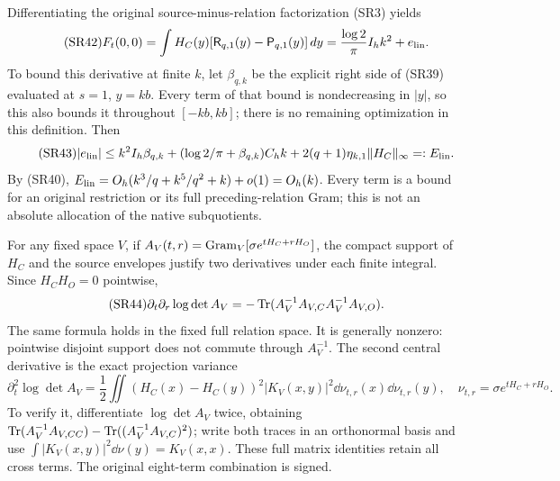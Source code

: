 \documentclass[11pt,a4paper]{article}
\begin{document}
Differentiating the original source-minus-relation factorization (SR3) yields
\begin{equation}\tag{SR42}
 F_t(0,0)=\int H_C(y)
 [\mathsf R_{q,1}(y)-\mathsf P_{q,1}(y)]\,d y
 =\frac{\log2}{\pi}I_hk^2+e_{\rm lin}.
\end{equation}
To bound this derivative at finite $k$, let $\beta_{q,k}$ be the explicit
right side of (SR39) evaluated at $s=1$, $y=kb$. Every term of that bound is
nondecreasing in $|y|$, so this also bounds it throughout $[-kb,kb]$; there
is no remaining optimization in this definition. Then
\begin{equation}\tag{SR43}
 |e_{\rm lin}|\le
 k^2I_h\beta_{q,k}
 +(\log2/\pi+\beta_{q,k})C_hk
 +2(q+1)\eta_{k,1}\|H_C\|_\infty=:E_{\rm lin}.
\end{equation}
By (SR40), $E_{\rm lin}=O_h(k^3/q+k^5/q^2+k)+o(1)=O_h(k)$.
Every term is a bound for an original restriction or its full preceding-relation
Gram; this is not an absolute allocation of the native subquotients.

For any fixed space $V$, if $A_V(t,r)=\operatorname{Gram}_V[\sigma e^{tH_C+rH_O}]$,
the compact support of $H_C$ and the source envelopes justify two derivatives
under each finite integral. Since $H_CH_O=0$ pointwise,
\begin{equation}\tag{SR44}
 \partial_t\partial_r\log\det A_V
 =-\operatorname{Tr}(A_V^{-1}A_{V,C}A_V^{-1}A_{V,O}).
\end{equation}
The same formula holds in the fixed full relation space. It is generally
nonzero: pointwise disjoint support does not commute through $A_V^{-1}$.
The second central derivative is the exact projection variance
\begin{equation}\tag{SR45}
 \partial_t^2\log\det A_V
 =\frac12\iint(H_C(x)-H_C(y))^2|K_V(x,y)|^2
 \dd\nu_{t,r}(x)\dd\nu_{t,r}(y),\quad
 \nu_{t,r}=\sigma e^{tH_C+rH_O}.
\end{equation}
To verify it, differentiate $\log\det A_V$ twice, obtaining
$\operatorname{Tr}(A_V^{-1}A_{V,CC})-\operatorname{Tr}((A_V^{-1}A_{V,C})^2)$;
write both traces in an orthonormal basis and use
$\int|K_V(x,y)|^2\dd\nu(y)=K_V(x,x)$. These full matrix identities retain
all cross terms. The original eight-term combination is signed.
\end{document}
